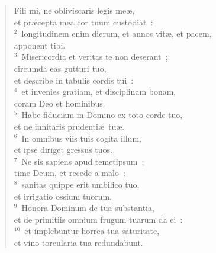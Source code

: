 \begin{flushleft}\begin{verse}\vspace{-19pt}Fili mi, ne obliviscaris legis me\ae ,\\ et pr\ae cepta mea cor tuum custodiat~:\\
${}^{2}$~longitudinem enim dierum, et annos vit\ae , et pacem,\\ apponent tibi.\\
${}^{3}$~Misericordia et veritas te non deserant~;\\ circumda eas gutturi tuo,\\ et describe in tabulis cordis tui~:\\
${}^{4}$~et invenies gratiam, et disciplinam bonam,\\ coram Deo et hominibus.\\
${}^{5}$~Habe fiduciam in Domino ex toto corde tuo,\\ et ne innitaris prudenti\ae\ tu\ae .\\
${}^{6}$~In omnibus viis tuis cogita illum,\\ et ipse diriget gressus tuos.\\
${}^{7}$~Ne sis sapiens apud temetipsum~;\\ time Deum, et recede a malo~:\\
${}^{8}$~sanitas quippe erit umbilico tuo,\\ et irrigatio ossium tuorum.\\
${}^{9}$~Honora Dominum de tua substantia,\\ et de primitiis omnium frugum tuarum da ei~:\\
${}^{10}$~et implebuntur horrea tua saturitate,\\ et vino torcularia tua redundabunt.\end{verse}\end{flushleft}


